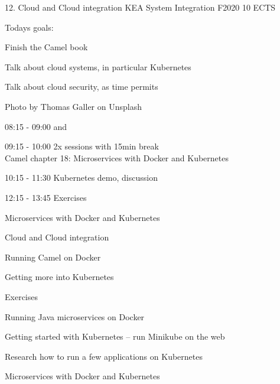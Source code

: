 \documentclass[Screen16to9,17pt]{foils}
\begin{document}
\mytitlepage
{12. Cloud and Cloud integration}
{KEA System Integration F2020 10 ECTS}




Todays goals:
\begin{list2}
\item Finish the Camel book
\item Talk about cloud systems, in particular Kubernetes
\item Talk about cloud security, as time permits
\end{list2}

Photo by Thomas Galler on Unsplash


\begin{list2}
\item 08:15 - 09:00 and
\item 09:15 - 10:00
2x sessions with 15min break\\
Camel chapter 18: Microservices with Docker and Kubernetes
\item 10:15 - 11:30 Kubernetes demo, discussion\\

\item 12:15 - 13:45
Exercises
\end{list2}



\begin{list2}
\item Microservices with Docker and Kubernetes
\item Cloud and Cloud integration
\item Running Camel on Docker
\item Getting more into Kubernetes
\end{list2}

Exercises
\begin{list2}
\item Running Java microservices on Docker
\item Getting started with Kubernetes -- run Minikube on the web
\item Research how to run a few applications on Kubernetes
\end{list2}



Microservices with Docker and Kubernetes


\end{document}
